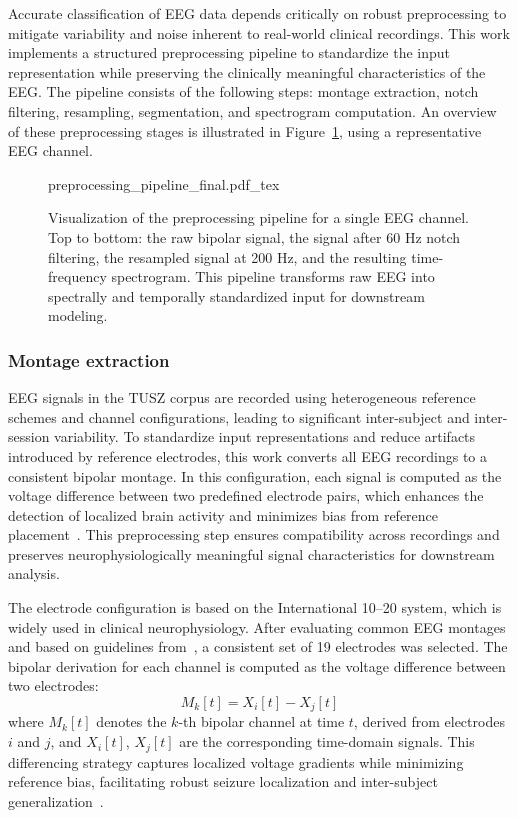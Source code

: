Accurate classification of EEG data depends critically on robust preprocessing to mitigate variability and noise inherent to real-world clinical recordings. This work implements a structured preprocessing pipeline to standardize the input representation while preserving the clinically meaningful characteristics of the EEG. The pipeline consists of the following steps: montage extraction, notch filtering, resampling, segmentation, and spectrogram computation. An overview of these preprocessing stages is illustrated in Figure~\ref{fig:pipeline}, using a representative EEG channel.
\begin{figure}[h!]
	\centering
    \def\svgwidth{430pt}
    \fontsize{7pt}{7pt}
 	{preprocessing_pipeline_final.pdf_tex} 	 	
	\caption[Preprocessing pipeline for EEG signals]{Visualization of the preprocessing pipeline for a single EEG channel. Top to bottom: the raw bipolar signal, the signal after 60 Hz notch filtering, the resampled signal at 200 Hz, and the resulting time-frequency spectrogram. This pipeline transforms raw EEG into spectrally and temporally standardized input for downstream modeling.}
	\label{fig:pipeline}
\end{figure}
\subsubsection{Montage extraction}
EEG signals in the TUSZ corpus are recorded using heterogeneous reference schemes and channel configurations, leading to significant inter-subject and inter-session variability. To standardize input representations and reduce artifacts introduced by reference electrodes, this work converts all EEG recordings to a consistent bipolar montage. In this configuration, each signal is computed as the voltage difference between two predefined electrode pairs, which enhances the detection of localized brain activity and minimizes bias from reference placement~\cite{seizureTUSZ}. This preprocessing step ensures compatibility across recordings and preserves neurophysiologically meaningful signal characteristics for downstream analysis.

The electrode configuration is based on the International 10–20 system, which is widely used in clinical neurophysiology. After evaluating common EEG montages and based on guidelines from~\cite{tuszChannelSelection}, a consistent set of 19 electrodes was selected. The bipolar derivation for each channel is computed as the voltage difference between two electrodes:
\begin{equation}
M_k[t] = X_i[t] - X_j[t]
\end{equation}
where $M_k[t]$ denotes the $k$-th bipolar channel at time $t$, derived from electrodes $i$ and $j$, and $X_i[t]$, $X_j[t]$ are the corresponding time-domain signals. This differencing strategy captures localized voltage gradients while minimizing reference bias, facilitating robust seizure localization and inter-subject generalization~\cite{tuszChannelSelection}.

